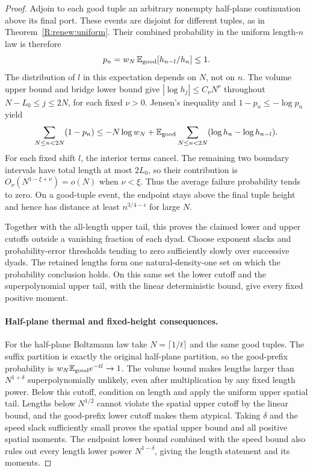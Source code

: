 \begin{proof}
Adjoin to each good tuple an arbitrary nonempty half-plane continuation
above its final port. These events are disjoint for different tuples,
as in Theorem~\ref{R:renew:uniform}. Their combined probability in the
uniform length-$n$ law is therefore
\[
 p_n=w_N\,\mathbb E_{\rm good}[h_{n-l}/h_n]\le1.
\]
The distribution of $l$ in this expectation depends on $N$, not on $n$.
The volume upper bound and bridge lower bound give
$|\log h_j|\le C_\nu N^\nu$ throughout $N-L_0\le j\le2N$, for each
fixed $\nu>0$. Jensen's inequality and $1-p_n\le-\log p_n$ yield
\[
 \sum_{N\le n<2N}(1-p_n)
 \le -N\log w_N+
 \mathbb E_{\rm good}\sum_{N\le n<2N}(\log h_n-\log h_{n-l}).
\]
For each fixed shift $l$, the interior terms cancel. The remaining two
boundary intervals have total length at most $2L_0$, so their contribution
is $O_\nu(N^{1-\xi+\nu})=o(N)$ when $\nu<\xi$. Thus the average failure
probability tends to zero. On a good-tuple event, the endpoint stays above
the final tuple height and hence has distance at least
$n^{3/4-\epsilon}$ for large $N$.

Together with the all-length upper tail, this proves the claimed lower
and upper cutoffs outside a vanishing fraction of each dyad. Choose
exponent slacks and probability-error thresholds tending to zero
sufficiently slowly over successive dyads. The retained lengths form
one natural-density-one set on which the probability conclusion holds.
On this same set the lower cutoff and the superpolynomial upper tail,
with the linear deterministic bound, give every fixed positive moment.

\paragraph{Half-plane thermal and fixed-height consequences.}
For the half-plane Boltzmann law take $N=\lceil1/t\rceil$ and the same
good tuples. The suffix partition is exactly the original half-plane
partition, so the good-prefix probability is
$w_N\mathbb E_{\rm good}e^{-tl}\to1$. The volume bound makes lengths
larger than $N^{1+\delta}$ superpolynomially unlikely, even after
multiplication by any fixed length power. Below this cutoff, condition
on length and apply the uniform upper spatial tail. Lengths below
$N^{1/2}$ cannot violate the spatial upper cutoff by the linear bound,
and the good-prefix lower cutoff makes them atypical. Taking $\delta$
and the speed slack sufficiently small proves the spatial upper bound
and all positive spatial moments. The endpoint lower bound combined
with the speed bound also rules out every length lower power
$N^{1-\delta}$, giving the length statement and its moments.


\end{proof}
